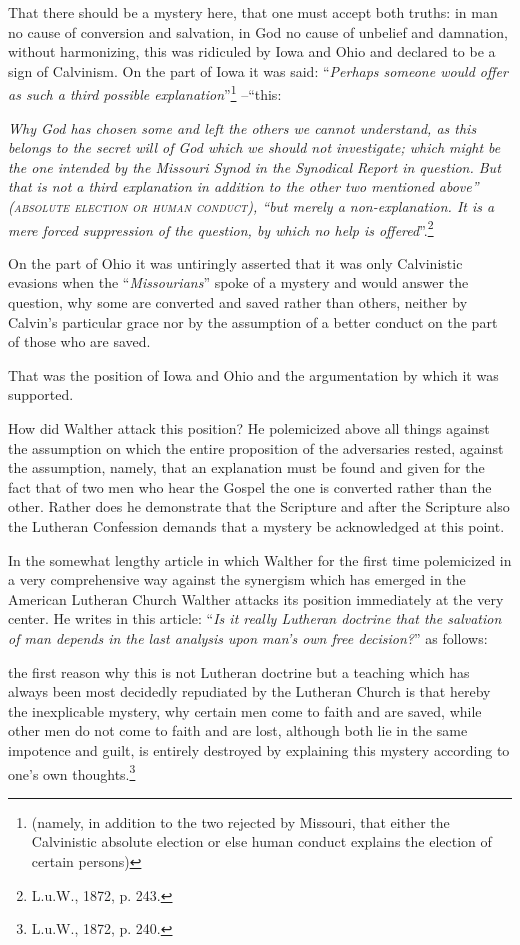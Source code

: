                 That there should be a mystery here, that one must accept both truths: in man no cause of conversion and salvation, in God no cause of unbelief and damnation, without harmonizing, this was ridiculed by Iowa and Ohio and declared to be a sign of Calvinism.  On the part of Iowa it was said: “\textit{Perhaps someone would offer as such a third possible explanation}”\footnote{(namely, in addition to the two rejected by Missouri, that either the Calvinistic absolute election or else human conduct explains the election of certain persons)} --“this:\begin{displayquote}\textit{ Why God has chosen some and left the others we cannot understand, as this belongs to the secret will of God which we should not investigate; which might be the one intended by the Missouri Synod in the Synodical Report in question.  But that is not a third explanation in addition to the other two mentioned above” {\scriptsize\textsc{(absolute election or human conduct),}} “but merely a non-explanation.  It is a mere forced suppression of the question, by which no help is offered}”.\footnote{L.u.W., 1872, p. 243.} \end{displayquote} On the part of Ohio it was untiringly asserted that it was only Calvinistic evasions when the “\textit{Missourians}” spoke of a mystery and would answer the question, why some are converted and saved rather than others, neither by Calvin’s particular grace nor by the assumption of a better conduct on the part of those who are saved.

                That was the position of Iowa and Ohio and the argumentation by which it was supported.

                How did Walther attack this position?  He polemicized above all things against the assumption on which the entire proposition of the adversaries rested, against the assumption, namely, that an explanation must be found and given for the fact that of two men who hear the Gospel the one is converted rather than the other.  Rather does he demonstrate that the Scripture and after the Scripture also the Lutheran Confession demands that a mystery be acknowledged at this point.

                In the somewhat lengthy article in which Walther for the first time polemicized in a very comprehensive way against the synergism which has emerged in the American Lutheran Church Walther attacks its position immediately at the very center.  He writes in this article: “\textit{Is it really Lutheran doctrine that the salvation of man depends in the last analysis upon man’s own free decision?}” as follows: \begin{fancyquotes}the first reason why this is not Lutheran doctrine but a teaching which has always been most decidedly repudiated by the Lutheran Church is that hereby the inexplicable mystery, why certain men come to faith and are saved, while other men do not come to faith and are lost, although both lie in the same impotence and guilt, is entirely destroyed by explaining this mystery according to one’s own thoughts.\footnote{L.u.W., 1872, p. 240.}\end{fancyquotes} 